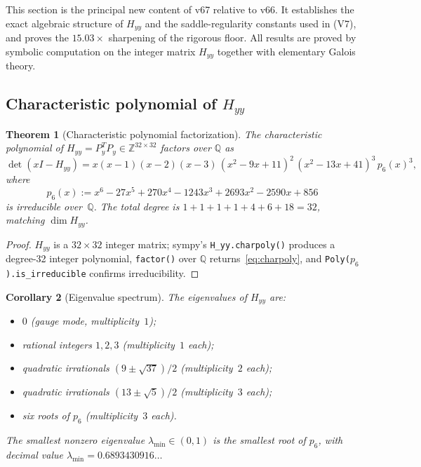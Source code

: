 \documentclass[11pt]{article}
\newtheorem{theorem}{Theorem}[section]
\newtheorem{corollary}[theorem]{Corollary}
\theoremstyle{definition}
\newcommand{\Z}{\mathbb{Z}}
\newcommand{\Q}{\mathbb{Q}}
\begin{document}
This section is the principal new content of v67 relative to v66.
It establishes the exact algebraic structure of $H_{yy}$ and the
saddle-regularity constants used in (V7), and proves the
$15.03\times$ sharpening of the rigorous floor.  All results are
proved by symbolic computation on the integer matrix $H_{yy}$
together with elementary Galois theory.

\subsection{Characteristic polynomial of $H_{yy}$}

\begin{theorem}[Characteristic polynomial factorization]
\label{thm:charpoly}
The characteristic polynomial of $H_{yy}=P_y^T P_y\in\Z^{32\times 32}$
factors over $\Q$ as
\begin{equation}\label{eq:charpoly}
\det(xI-H_{yy})
=x(x-1)(x-2)(x-3)\,(x^2-9x+11)^2\,(x^2-13x+41)^3\,p_6(x)^3,
\end{equation}
where
\[
p_6(x):=x^6-27x^5+270x^4-1243x^3+2693x^2-2590x+856
\]
is irreducible over~$\Q$.  The total degree is
$1+1+1+1+4+6+18=32$, matching $\dim H_{yy}$.
\end{theorem}

\begin{proof}
$H_{yy}$ is a $32\times 32$ integer matrix; sympy's
\texttt{H\_yy.charpoly()} produces a degree-32 integer polynomial,
\texttt{factor()} over $\Q$ returns~\eqref{eq:charpoly}, and
\texttt{Poly($p_6$).is\_irreducible} confirms irreducibility.
\end{proof}

\begin{corollary}[Eigenvalue spectrum]\label{cor:spectrum}
The eigenvalues of $H_{yy}$ are:
\begin{itemize}[nosep]
\item $0$ (gauge mode, multiplicity~$1$);
\item rational integers $1, 2, 3$ (multiplicity~$1$ each);
\item quadratic irrationals $(9\pm\sqrt{37})/2$ (multiplicity~$2$ each);
\item quadratic irrationals $(13\pm\sqrt{5})/2$ (multiplicity~$3$ each);
\item six roots of $p_6$ (multiplicity~$3$ each).
\end{itemize}
The smallest nonzero eigenvalue $\lambda_{\min}\in(0,1)$ is the
smallest root of $p_6$, with decimal value
$\lambda_{\min}=0.6893430916\ldots$
\end{corollary}
\end{document}
